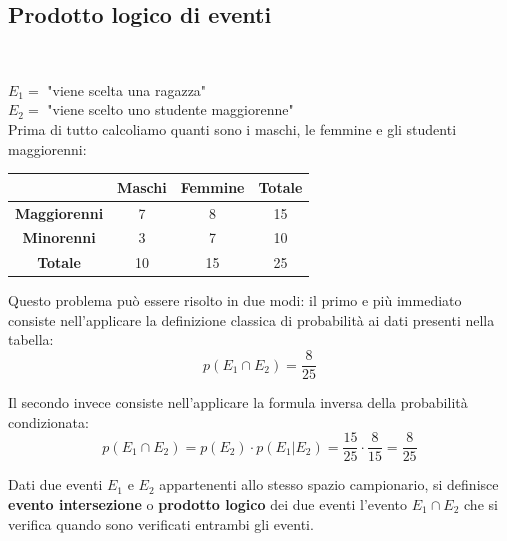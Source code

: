 \documentclass{article}     %
\begin{document}
            \subsection{Prodotto logico di eventi}~
            \begin{ex}
            \noindent
            $E_1 =$ "viene scelta una ragazza"\\
            $E_2 = $ "viene scelto uno studente maggiorenne"\\
            Prima di tutto calcoliamo quanti sono i maschi, le femmine e gli studenti maggiorenni:
            \begin{center}
            \begin{tabular}{|c|c|c|c|}
                \hline 
                & \textbf{Maschi} & \textbf{Femmine} & \textbf{Totale}\\ \hline 
                \textbf{Maggiorenni} & 7 & 8 & 15\\ \hline
                \textbf{Minorenni} & 3 & 7 & 10\\ \hline
                \textbf{Totale} & 10 & 15 & 25\\ \hline
            \end{tabular}
            \end{center}
            
            Questo problema può essere risolto in due modi: il primo e più immediato consiste nell'applicare la definizione classica di probabilità ai dati presenti nella tabella:
            \[p(E_1\cap E_2)=\frac{8}{25}\]
            
            Il secondo invece consiste nell'applicare la formula inversa della probabilità condizionata:
            \[p(E_1\cap E_2)=p(E_2)\cdot p(E_1|E_2)=\frac{15}{25}\cdot\frac{8}{15}=\frac{8}{25}\]
        \end{ex}

                \begin{boxdef}
                    Dati due eventi $E_1$ e $E_2$ appartenenti allo stesso spazio campionario, si definisce \textbf{evento intersezione} o \textbf{prodotto logico} dei due eventi l'evento $E_1 \cap E_2$ che si verifica quando sono verificati entrambi gli eventi.
                \end{boxdef}
\end{document}
